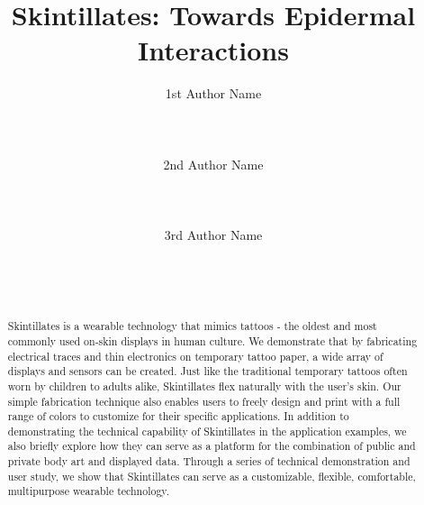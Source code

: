 \documentclass{sigchi}
\begin{document}
\title{Skintillates: Towards Epidermal Interactions}

\author{
  \alignauthor 1st Author Name\\
    \\
    \\
    \\
  \alignauthor 2nd Author Name\\
    \\
    \\
    \\
  \alignauthor 3rd Author Name\\
    \\
    \\
    \\
}

\maketitle

\begin{abstract}
Skintillates is a wearable technology that mimics tattoos - the oldest and most commonly used on-skin displays in human culture. We demonstrate that by fabricating electrical traces and thin electronics on temporary tattoo paper, a wide array of displays and sensors can be created. Just like the traditional temporary tattoos often worn by children to adults alike, Skintillates flex naturally with the user's skin. Our simple fabrication technique also enables users to freely design and print with a full range of colors to customize for their specific applications. In addition to demonstrating the technical capability of Skintillates in the application examples, we also briefly explore how they can serve as a platform for the combination of public and private body art and displayed data. Through a series of technical demonstration and user study, we show that Skintillates can serve as a customizable, flexible, comfortable, multipurpose wearable technology. 
\end{abstract}


\end{document}
